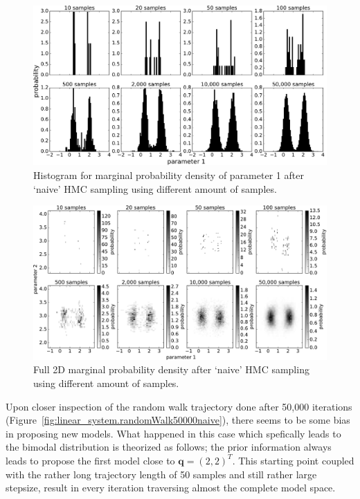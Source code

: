 \begin{figure}
	\centering
	\includegraphics[width=\textwidth]{simple-linear-system/figures/2d_naive/histogram_p1.pdf}
	\caption{Histogram for marginal probability density of parameter 1 after `naive' HMC sampling using different amount of
	samples.}
	\label{fig:linear_system.histq1}
\end{figure}

\begin{figure}
	\centering
	\includegraphics[width=\textwidth]{simple-linear-system/figures/2d_naive/histogram_2d.pdf}
	\caption{Full 2D marginal probability density after `naive' HMC sampling using different amount of
	samples.}
	\label{fig:linear_system.hist2d}
\end{figure}

\afterpage{\clearpage}

Upon closer inspection of the random walk trajectory done after 50,000 iterations (Figure~\ref{fig:linear_system.randomWalk50000naive}), there seems to be some bias in proposing new models. What happened in this case which spefically leads to the bimodal distribution is theorized as follows; the prior information always leads to propose the first model close to $\mathbf{q} = (2,2)^T$. This starting point coupled with the rather long trajectory length of 50 samples and still rather large stepsize, result in every iteration traversing almost the complete model space.

